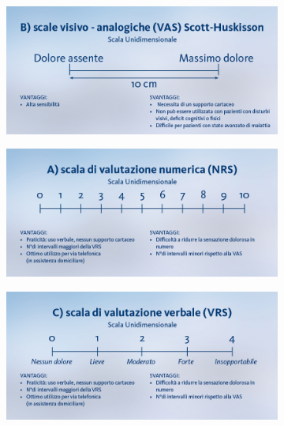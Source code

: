 \begin{figure}[H]
    \begin{subfigure}[b]{0.5\textwidth}
            \includegraphics[width=\linewidth]{img/VAS.jpeg}
            
           
    \end{subfigure}
    \begin{subfigure}[b]{0.5\textwidth}
        \includegraphics[width=\linewidth]{img/NUMERICA.jpeg}
        
        
\end{subfigure}
    \begin{subfigure}[b]{0.5\textwidth}
        \includegraphics[width=\linewidth]{img/VERBALE.jpeg}
    

\end{subfigure}
\end{figure}
